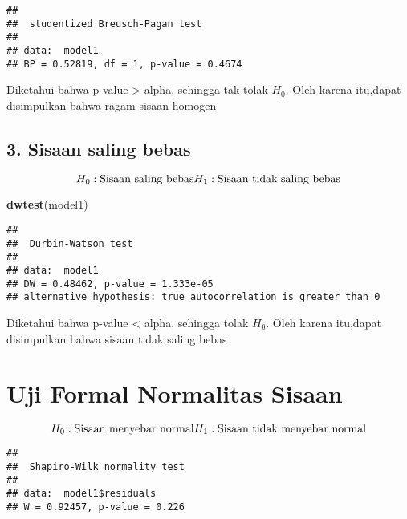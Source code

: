 \documentclass[
]{article}
\newenvironment{Shaded}{\begin{snugshade}}{\end{snugshade}}
\newcommand{\FunctionTok}[1]{\textcolor[rgb]{0.13,0.29,0.53}{\textbf{#1}}}
\newcommand{\NormalTok}[1]{#1}
\newcommand{\SpecialCharTok}[1]{\textcolor[rgb]{0.81,0.36,0.00}{\textbf{#1}}}
\begin{document}
\begin{verbatim}
## 
##  studentized Breusch-Pagan test
## 
## data:  model1
## BP = 0.52819, df = 1, p-value = 0.4674
\end{verbatim}

Diketahui bahwa p-value \textgreater{} alpha, sehingga tak tolak
\(H_0\). Oleh karena itu,dapat disimpulkan bahwa ragam sisaan homogen

\hypertarget{sisaan-saling-bebas}{%
\subsection{3. Sisaan saling bebas}\label{sisaan-saling-bebas}}

\[
H_0 : \text{Sisaan saling bebas}\\H_1 : \text{Sisaan tidak saling bebas}
\]

\begin{Shaded}
\begin{Highlighting}[]
\FunctionTok{dwtest}\NormalTok{(model1)}
\end{Highlighting}
\end{Shaded}

\begin{verbatim}
## 
##  Durbin-Watson test
## 
## data:  model1
## DW = 0.48462, p-value = 1.333e-05
## alternative hypothesis: true autocorrelation is greater than 0
\end{verbatim}

Diketahui bahwa p-value \textless{} alpha, sehingga tolak \(H_0\). Oleh
karena itu,dapat disimpulkan bahwa sisaan tidak saling bebas

\hypertarget{uji-formal-normalitas-sisaan}{%
\section{Uji Formal Normalitas
Sisaan}\label{uji-formal-normalitas-sisaan}}

\[
H_0 : \text{Sisaan menyebar normal}\\H_1 : \text{Sisaan tidak menyebar normal}
\]

\begin{Shaded}
\end{Shaded}

\begin{verbatim}
## 
##  Shapiro-Wilk normality test
## 
## data:  model1$residuals
## W = 0.92457, p-value = 0.226
\end{verbatim}
\end{document}
